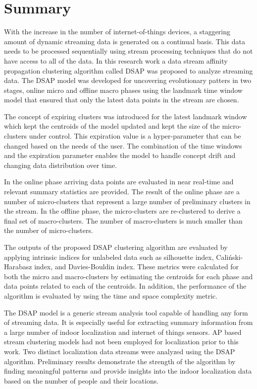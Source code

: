 \section{Summary}

With the increase in the number of internet-of-things devices, a staggering amount of dynamic streaming data is generated on a continual basis. This data needs to be processed sequentially using stream processing techniques that do not have access to all of the data. In this research work a data stream affinity propagation clustering algorithm called DSAP was proposed to analyze streaming data. The DSAP model was developed for uncovering evolutionary patters in two stages, online micro and offline macro phases using the landmark time window model that ensured that only the latest data points in the stream are chosen.

The concept of expiring clusters was introduced for the latest landmark window which kept the centroids of the model updated and kept the size of the micro-clusters  under control. This expiration value is a hyper-parameter that can be changed based on the needs of the user. The combination of the time windows and the expiration parameter enables the model to handle concept drift and changing data distribution over time.

In the online phase arriving data points are evaluated in near real-time and relevant summary statistics are provided. The result of the online phase are a number of micro-clusters that represent a large number of preliminary clusters in the stream. In the offline phase, the micro-clusters are re-clustered to derive a final set of macro-clusters. The number of macro-clusters is much smaller than the number of micro-clusters.

The outputs of the proposed DSAP clustering algorithm are evaluated by applying intrinsic indices for unlabeled data such as silhouette index, Caliński-Harabasz index, and Davies-Bouldin index. These metrics were calculated for both the micro and macro-clusters by estimating the centroids for each phase and data points related to each of the centroids. In addition, the performance of the algorithm is evaluated by using the time and space complexity metric. 


The DSAP model is a generic stream analysis tool capable of handling any form of streaming data. It is especially useful for extracting summary information from a large number of indoor localization and internet of things sensors. AP based stream clustering models had not been employed for localization prior to this work. Two distinct localization data streams were analyzed using the DSAP algorithm. Preliminary results demonstrate the strength of the algorithm by finding meaningful patterns and provide insights into the indoor localization data based on the number of people and their locations. 


